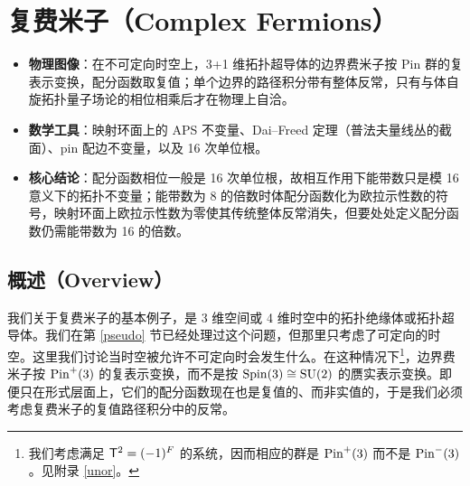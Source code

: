 
\section{复费米子（Complex Fermions）}\label{complex}

\begin{keytakeaways}
\begin{itemize}[leftmargin=1.6em,itemsep=0.2em,topsep=0.2em]
  \item \textbf{物理图像}：在不可定向时空上，3+1 维拓扑超导体的边界费米子按 Pin 群的复表示变换，配分函数取复值；单个边界的路径积分带有整体反常，只有与体自旋拓扑量子场论的相位相乘后才在物理上自洽。
  \item \textbf{数学工具}：映射环面上的 APS 不变量、Dai--Freed 定理（普法夫量线丛的截面）、pin 配边不变量，以及 16 次单位根。
  \item \textbf{核心结论}：配分函数相位一般是 16 次单位根，故相互作用下能带数只是模 16 意义下的拓扑不变量；能带数为 8 的倍数时体配分函数化为欧拉示性数的符号，映射环面上欧拉示性数为零使其传统整体反常消失，但要处处定义配分函数仍需能带数为 16 的倍数。
\end{itemize}
\end{keytakeaways}

\subsection{概述（Overview）}\label{overv}

我们关于复费米子的基本例子，是 3 维空间或 4 维时空中的拓扑绝缘体或拓扑超导体。我们在第 \ref{pseudo} 节已经处理过这个问题，但那里只考虑了可定向的时空。这里我们讨论当时空被允许不可定向时会发生什么。在这种情况下\footnote{我们考虑满足 ${\sf T}^2=(-1)^F$ 的系统，因而相应的群是 ${\mathrm{Pin}}^+(3)$ 而不是 ${\mathrm{Pin}}^-(3)$。见附录 \ref{unor}。}，边界费米子按 ${\mathrm{Pin}}^+(3)$ 的复表示变换，而不是按 ${\mathrm{Spin}}(3) \cong {\mathrm{SU}}(2)$ 的赝实表示变换。即便只在形式层面上，它们的配分函数现在也是复值的、而非实值的，于是我们必须考虑复费米子的复值路径积分中的反常。


